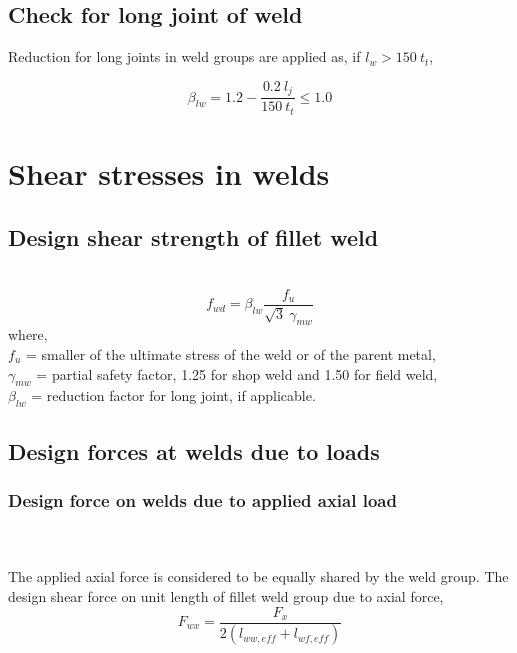 \documentclass[11.5pt,a4paper,oneside]{report}
\begin{document}
\begin{Form}
\subsection{Check for long joint of weld}
Reduction for long joints in weld groups are applied as,
if $l_w > 150~t_t$,

\begin{equation}
	\beta_{lw}=1.2-\frac{0.2~l_j}{150~t_t} \le 1.0
\end{equation}


\section{Shear stresses in welds}

\subsection{Design shear strength of fillet weld}
\quad \quad [Reference: Cl. 10.5.7.1.1, IS 800:2007] \\

\begin{equation}
	f_{wd} = \beta_{lw} \frac{f_u}{\sqrt{3}~\gamma_{mw}}
\end{equation}
where, \\
\indent $f_u$ = smaller of the ultimate stress of the weld or of the parent metal, \\
\indent $\gamma_{mw}$ = partial safety factor, 1.25 for shop weld and 1.50 for field weld, \\
\indent $\beta_{lw}$ = reduction factor for long joint, if applicable. \\

\subsection{Design forces at welds due to loads}

\subsubsection{Design force on welds due to applied axial load}
\quad \quad[Reference: Cl. 10.11.2.1(a), IS 800:2007] \\ \\
The applied axial force is considered to be equally shared by the weld group.
The design shear force on unit length of fillet weld group due to axial force,
\begin{equation}
	F_{wx} = \frac{F_x}{2(l_{ww,eff} + l_{wf,eff})}
\end{equation}


\end{Form}
\end{document}
